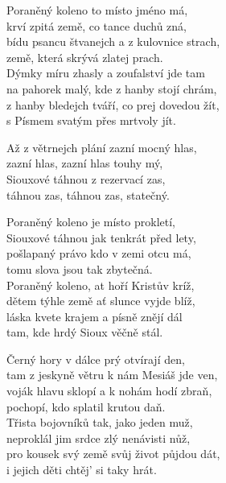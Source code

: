 
\ve{}
Poraněný koleno to místo jméno má, \\
krví zpitá země, co tance duchů zná, \\
bídu psancu štvanejch a z kulovnice strach, \\
země, která skrývá zlatej prach.\\[4px]
Dýmky míru zhasly a zoufalství jde tam \\
na pahorek malý, kde z hanby stojí chrám,\\ 
z hanby bledejch tváří, co prej dovedou žít, \\
s Písmem svatým přes mrtvoly jít. 

\cho{}
Až z větrnejch plání zazní mocný hlas, \\
zazní hlas, zazní hlas touhy mý, \\
Siouxové táhnou z rezervací zas, \\
táhnou zas, táhnou zas, statečný. 

\ve{}
Poraněný koleno je místo prokletí, \\
Siouxové táhnou jak tenkrát před lety, \\
pošlapaný právo kdo v zemi otcu má, \\
tomu slova jsou tak zbytečná. \\[4px]
Poraněný koleno, at hoří Kristův kríž, \\
dětem týhle země ať slunce vyjde blíž, \\
láska kvete krajem a písně znějí dál \\
tam, kde hrdý Sioux věčně stál.
\vspace{-5pt}
\cho{}

\ve{}
Černý hory v dálce prý otvírají den, \\
tam z jeskyně větru k nám Mesiáš jde ven, \\
voják hlavu sklopí a k nohám hodí zbraň, \\
pochopí, kdo splatil krutou daň. \\[4px]
Třista bojovníků tak, jako jeden muž, \\
neproklál jim srdce zlý nenávisti nůž, \\
pro kousek svý země svůj život půjdou dát, \\
i jejich děti chtěj' si taky hrát.
\vspace{-5pt}
\cho{}

\esong{}